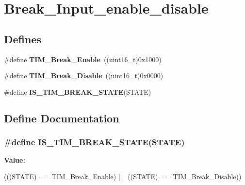\hypertarget{group__Break__Input__enable__disable}{
\section{Break\_\-Input\_\-enable\_\-disable}
\label{group__Break__Input__enable__disable}
}
\subsection*{Defines}
\begin{DoxyCompactItemize}
\item 
\hypertarget{group__Break__Input__enable__disable_gae7fbc11ac043454b2a880bffe98fdb8c}{
\#define {\bfseries TIM\_\-Break\_\-Enable}~((uint16\_\-t)0x1000)}
\label{group__Break__Input__enable__disable_gae7fbc11ac043454b2a880bffe98fdb8c}

\item 
\hypertarget{group__Break__Input__enable__disable_ga31ba16dd70ad4d99adc911f7bf6662e5}{
\#define {\bfseries TIM\_\-Break\_\-Disable}~((uint16\_\-t)0x0000)}
\label{group__Break__Input__enable__disable_ga31ba16dd70ad4d99adc911f7bf6662e5}

\item 
\#define {\bfseries IS\_\-TIM\_\-BREAK\_\-STATE}(STATE)
\end{DoxyCompactItemize}


\subsection{Define Documentation}
\hypertarget{group__Break__Input__enable__disable_ga29dd5484bdc69a467387bd8059b69f0e}{
\subsubsection[{IS\_\-TIM\_\-BREAK\_\-STATE}]{\setlength{\rightskip}{0pt plus 5cm}\#define IS\_\-TIM\_\-BREAK\_\-STATE(STATE)}}
\label{group__Break__Input__enable__disable_ga29dd5484bdc69a467387bd8059b69f0e}
{\bfseries Value:}
\begin{DoxyCode}
(((STATE) == TIM_Break_Enable) || \
                                   ((STATE) == TIM_Break_Disable))
\end{DoxyCode}
